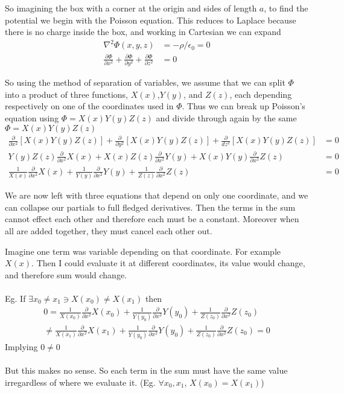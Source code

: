 \documentclass{article}
\begin{document}
So imagining the box with a corner at the origin and sides of length $a$, to find the potential we begin with the Poisson equation. This reduces to Laplace because there is no charge inside the box, and working in Cartesian we can expand
\begin{align*}
\nabla^{2}\Phi(x,y,z) &= -\rho/\epsilon_{0} = 0\\
\frac{\partial\Phi}{\partial x^{2}} + \frac{\partial\Phi}{\partial y^{2}} + \frac{\partial\Phi}{\partial z^{2}} &= 0
\end{align*}

So using the method of separation of variables, we assume that we can split $\Phi$ into a product of three functions, $X(x)$,$Y(y)$, and $Z(z)$, each depending respectively on one of the coordinates used in $\Phi$. Thus we can break up Poisson's equation using $\Phi=X(x)Y(y)Z(z)$ and divide through again by the same $\Phi=X(x)Y(y)Z(z)$
\begin{align*}
\frac{\partial}{\partial x^{2}}\left[X(x)Y(y)Z(z)\right] + \frac{\partial}{\partial y^{2}}\left[X(x)Y(y)Z(z)\right] + \frac{\partial}{dz^{2}}\left[X(x)Y(y)Z(z)\right] &= 0\\
Y(y)Z(z)\frac{\partial}{\partial x^{2}}X(x) + X(x)Z(z)\frac{\partial}{\partial x^{2}}Y(y) + X(x)Y(y)\frac{\partial}{\partial x^{2}}Z(z) &= 0\\
\frac{1}{X(x)}\frac{\partial}{\partial x^{2}}X(x) + \frac{1}{Y(y)}\frac{\partial}{\partial x^{2}}Y(y) + \frac{1}{Z(z)}\frac{\partial}{\partial x^{2}}Z(z) &= 0
\end{align*}

We are now left with three equations that depend on only one coordinate, and we can collapse our partials to full fledged derivatives. Then the terms in the sum cannot effect each other and therefore each must be a constant. Moreover when all are added together, they must cancel each other out.

Imagine one term was variable depending on that coordinate. For example $X(x)$. Then I could evaluate it at different coordinates, its value would change, and therefore sum would change.\\
\\
Eg. If $\exists x_{0}\ne x_{1}\ni X(x_{0})\ne X(x_{1})$ then 
\begin{multline*}
0 = \frac{1}{X(x_{0})}\frac{\partial}{\partial x^{2}}X(x_{0}) + \frac{1}{Y(y_{0})}\frac{\partial}{\partial x^{2}}Y(y_{0}) + \frac{1}{Z(z_{0})}\frac{\partial}{\partial x^{2}}Z(z_{0})\\
\ne \frac{1}{X(x_{1})}\frac{\partial}{\partial x^{2}}X(x_{1}) + \frac{1}{Y(y_{0})}\frac{\partial}{\partial x^{2}}Y(y_{0}) + \frac{1}{Z(z_{0})}\frac{\partial}{\partial x^{2}}Z(z_{0}) = 0
\end{multline*}
Implying $0\ne0$\\
\\
But this makes no sense. So each term in the sum must have the same value irregardless of where we evaluate it. (Eg. $\forall x_{0},x_{1}$, $X(x_{0})=X(x_{1})$)
\end{document}
